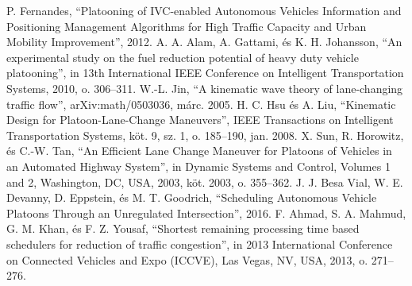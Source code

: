\documentclass{article}
\begin{document}
	\begin{thebibliography}{9}
		P. Fernandes, ``Platooning of IVC-enabled Autonomous Vehicles Information and Positioning Management Algorithms for High Traffic Capacity and Urban Mobility Improvement'', 2012.
		A. A. Alam, A. Gattami, és K. H. Johansson, ``An experimental study on the fuel reduction potential of heavy duty vehicle platooning'', in 13th International IEEE Conference on Intelligent Transportation Systems, 2010, o. 306–311.
		W.-L. Jin, ``A kinematic wave theory of lane-changing traffic flow'', arXiv:math/0503036, márc. 2005.
		H. C. Hsu és A. Liu, ``Kinematic Design for Platoon-Lane-Change Maneuvers'', IEEE Transactions on Intelligent Transportation Systems, köt. 9, sz. 1, o. 185–190, jan. 2008.
		X. Sun, R. Horowitz, és C.-W. Tan, ``An Efficient Lane Change Maneuver for Platoons of Vehicles in an Automated Highway System'', in Dynamic Systems and Control, Volumes 1 and 2, Washington, DC, USA, 2003, köt. 2003, o. 355–362.
		J. J. Besa Vial, W. E. Devanny, D. Eppstein, és M. T. Goodrich, ``Scheduling Autonomous Vehicle Platoons Through an Unregulated Intersection'', 2016.
		F. Ahmad, S. A. Mahmud, G. M. Khan, és F. Z. Yousaf, ``Shortest remaining processing time based schedulers for reduction of traffic congestion'', in 2013 International Conference on Connected Vehicles and Expo (ICCVE), Las Vegas, NV, USA, 2013, o. 271–276.
		
	\end{thebibliography}
\end{document}

